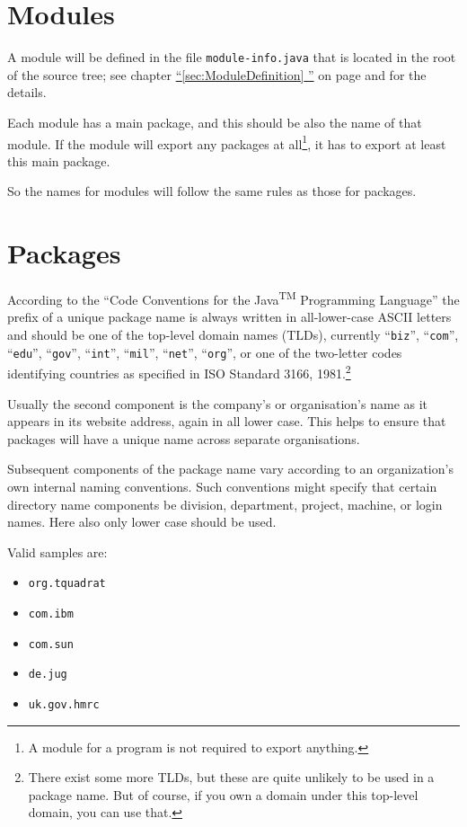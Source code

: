 \documentclass[12pt,a4paper,titlepage, parskip=half, headsepline, footsepline, cleardoubleplain]{scrbook}
\newcommand*{\tqfullvref}[1]{\hyperref[{#1}]{“\ref*{#1} \nameref*{#1}”} on page \pageref{#1}}
\begin{document}
\section{Modules}\label{sec:Modules}
A module will be defined in the file \verb#module-info.java# that is located in the root of the source tree; see chapter \tqfullvref{sec:ModuleDefinition} and \autocite{ORACLE_DOC_LANGUAGE_SPECIFICATION:ModuleDeclarations} for the details.

Each module has a main package, and this should be also the name of that module. If the module will export any packages at all\footnote{A module for a program is not required to export anything.}, it has to export at least this main package.

So the names for modules will follow the same rules as those for packages.

\section{Packages}\label{sec:Packages}
According to the “Code Conventions for the Java\textsuperscript{TM} Programming Language” \autocite{SUN_CODE_CONVENTIONS} the prefix of a unique package name is always written in all-lower-case ASCII letters and should be one of the top-level domain names (TLDs), currently “\verb#biz#”, “\verb#com#”, “\verb#edu#”, “\verb#gov#”, “\verb#int#”, “\verb#mil#”, “\verb#net#”, “\verb#org#”, or one of the two-letter codes identifying countries as specified in ISO Standard 3166, 1981.\footnote{There exist some more TLDs, but these are quite unlikely to be used in a package name. But of course, if you own a domain under this top-level domain, you can use that.}

Usually the second component is the company's or organisation's name as it appears in its website address, again in all lower case. This helps to ensure that packages will have a unique name across separate organisations.

Subsequent components of the package name vary according to an organization's own internal naming conventions. Such conventions might specify that certain directory name components be division, department, project, machine, or login names. Here also only lower case should be used.

Valid samples are:
\begin{itemize}[nosep]
\item\verb#org.tquadrat#
\item\verb#com.ibm#
\item\verb#com.sun#
\item\verb#de.jug#
\item\verb#uk.gov.hmrc#
\end{itemize}
\end{document}
